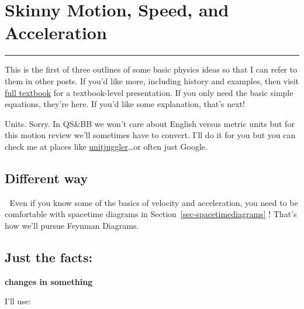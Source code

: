 \documentclass[
  letterpaper,
  DIV=11,
  numbers=noendperiod,
  oneside]{scrreprt}
\begin{document}
\chapter{Skinny Motion, Speed, and
Acceleration}\label{skinny-motion-speed-and-acceleration}

\begin{center}\rule{0.5\linewidth}{0.5pt}\end{center}

This is the first of three outlines of some basic physics ideas so that
I can refer to them in other posts. If you'd like more, including
history and examples, then visit
\href{https://qstbb.pa.msu.edu/storage/ISP220_fall2020/QS&BB2020/intro.html}{full
textbook} for a textbook-level presentation. If you only need the basic
simple equations, they're here. If you'd like some explanation, that's
next!

Units. Sorry. In QS\&BB we won't care about English versus metric units
but for this motion review we'll sometimes have to convert. I'll do it
for you but you can check me at places like
\href{https://www.unitjuggler.com/index.html}{unitjuggler}\ldots or
often just Google.

\section{Different way}\label{different-way}

\begin{tcolorbox}[enhanced jigsaw, colbacktitle=quarto-callout-important-color!10!white, rightrule=.15mm, toptitle=1mm, arc=.35mm, breakable, left=2mm, title={Important}, colframe=quarto-callout-important-color-frame, bottomrule=.15mm, colback=white, titlerule=0mm, leftrule=.75mm, toprule=.15mm, coltitle=black, opacityback=0, opacitybacktitle=0.6, bottomtitle=1mm]

🫵 Even if you know some of the basics of velocity and acceleration, you
need to be comfortable with spacetime diagrams in
Section~\ref{sec-spacetimediagrams} ! That's how we'll pursue Feynman
Diagrams.

\end{tcolorbox}

\section{Just the facts:}\label{just-the-facts}

\textbf{changes in something}

I'll use:
\end{document}
